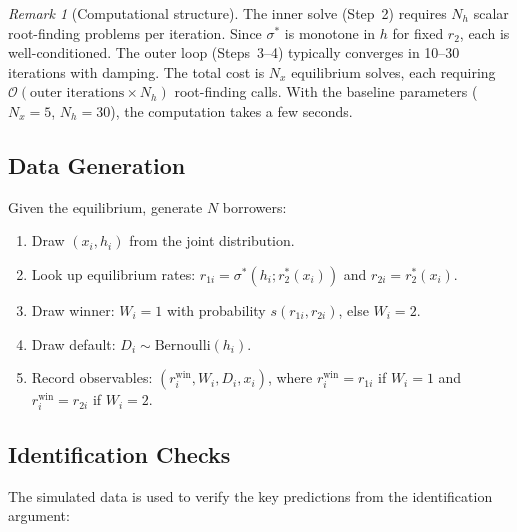\documentclass[12pt]{article}
\theoremstyle{plain}
\theoremstyle{plain}
\theoremstyle{definition}  %
\theoremstyle{remark}  %
\newtheorem{remark}[thm]{Remark}  %
\begin{document}
\begin{remark}[Computational structure]
The inner solve (Step~2) requires $N_h$ scalar root-finding problems per iteration. Since $\sigma^*$ is monotone in $h$ for fixed $r_2$, each is well-conditioned. The outer loop (Steps~3--4) typically converges in 10--30 iterations with damping. The total cost is $N_x$ equilibrium solves, each requiring $\mathcal{O}(\text{outer iterations} \times N_h)$ root-finding calls. With the baseline parameters ($N_x = 5$, $N_h = 30$), the computation takes a few seconds.
\end{remark}

\subsection{Data Generation}\label{sec:data_gen}

Given the equilibrium, generate $N$ borrowers:
\begin{enumerate}
    \item Draw $(x_i, h_i)$ from the joint distribution.
    \item Look up equilibrium rates: $r_{1i} = \sigma^*(h_i; r_2^*(x_i))$ and $r_{2i} = r_2^*(x_i)$.
    \item Draw winner: $W_i = 1$ with probability $s(r_{1i}, r_{2i})$, else $W_i = 2$.
    \item Draw default: $D_i \sim \text{Bernoulli}(h_i)$.
    \item Record observables: $(r_i^{\text{win}}, W_i, D_i, x_i)$, where $r_i^{\text{win}} = r_{1i}$ if $W_i = 1$ and $r_i^{\text{win}} = r_{2i}$ if $W_i = 2$.
\end{enumerate}

\subsection{Identification Checks}\label{sec:id_checks}

The simulated data is used to verify the key predictions from the identification argument:
\end{document}
